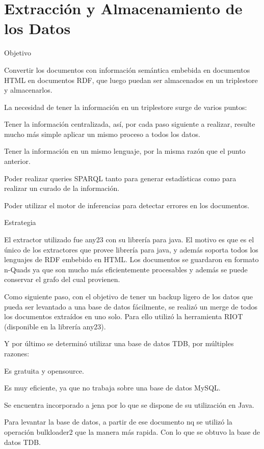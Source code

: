 \chapter{Extracción y Almacenamiento de los Datos}
\label{chapter:extraccion}

Objetivo

Convertir los documentos con información semántica embebida en documentos HTML en documentos RDF, que luego puedan ser 
almacenados en un triplestore y almacenarlos.

La necesidad de tener la información en un triplestore surge de varios puntos:

Tener la información centralizada, así, por cada paso siguiente a realizar, resulte mucho más simple aplicar un mismo proceso a todos los datos.

Tener la información en un mismo lenguaje, por la misma razón que el punto anterior.

Poder realizar queries SPARQL tanto para generar estadísticas como para realizar un curado de la información.

Poder utilizar el motor de inferencias para detectar errores en los documentos.

Estrategia

El extractor utilizado fue any23 con su librería para java. El motivo es que es el único de los extractores que provee librería para java, y además soporta todos los lenguajes de RDF embebido en HTML.
Los documentos se guardaron en formato n-Quads ya que son mucho más eficientemente procesables y además se puede conservar el grafo del cual provienen.

Como siguiente paso, con el objetivo de tener un backup ligero de los datos que pueda ser levantado a una base de datos fácilmente, se realizó un merge de todos los documentos extraídos en uno solo.
Para ello utilizó la herramienta RIOT (disponible en la librería any23).

Y por último se determinó utilizar una base de datos TDB, por múltiples razones:

Es gratuita y opensource. 

Es muy eficiente, ya que no trabaja sobre una base de datos MySQL.

Se encuentra incorporado a jena por lo que se dispone de su utilización en Java.

Para levantar la base de datos, a partir de ese documento nq se utilizó la operación bulkloader2 que la manera más rapida. Con lo que se obtuvo la base de datos TDB.

